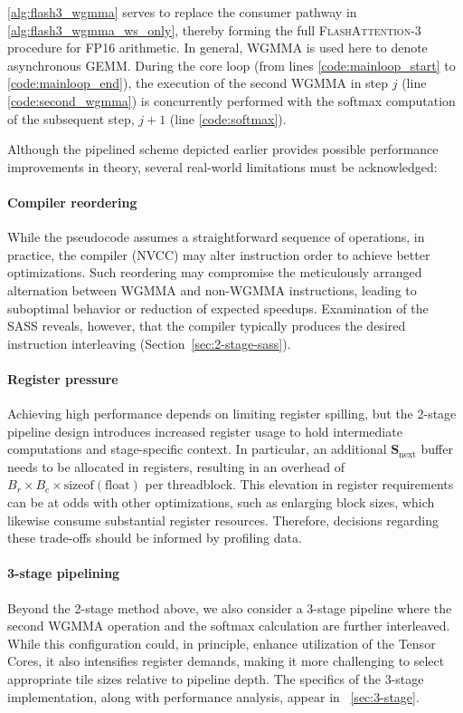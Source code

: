 \cref{alg:flash3_wgmma} serves to replace the consumer pathway in \cref{alg:flash3_wgmma_ws_only}, thereby forming the full \textsc{FlashAttention-3} procedure for FP16 arithmetic. In general, WGMMA is used here to denote asynchronous GEMM. During the core loop (from lines \ref{code:mainloop_start} to \ref{code:mainloop_end}), the execution of the second WGMMA in step $j$ (line \ref{code:second_wgmma}) is concurrently performed with the softmax computation of the subsequent step, $j+1$ (line \ref{code:softmax}).

Although the pipelined scheme depicted earlier provides possible performance improvements in theory, several real-world limitations must be acknowledged:
\paragraph{Compiler reordering} While the pseudocode assumes a straightforward sequence of operations, in practice, the compiler (NVCC) may alter instruction order to achieve better optimizations. Such reordering may compromise the meticulously arranged alternation between WGMMA and non-WGMMA instructions, leading to suboptimal behavior or reduction of expected speedups. Examination of the SASS reveals, however, that the compiler typically produces the desired instruction interleaving (Section~\ref{sec:2-stage-sass}).
\paragraph{Register pressure} Achieving high performance depends on limiting register spilling, but the 2-stage pipeline design introduces increased register usage to hold intermediate computations and stage-specific context. In particular, an additional $\mathbf{S}_{\mathrm{next}}$ buffer needs to be allocated in registers, resulting in an overhead of $B_r \times B_c \times \text{sizeof}(\text{float})$ per threadblock. This elevation in register requirements can be at odds with other optimizations, such as enlarging block sizes, which likewise consume substantial register resources. Therefore, decisions regarding these trade-offs should be informed by profiling data.
\paragraph{3-stage pipelining} Beyond the 2-stage method above, we also consider a 3-stage pipeline where the second WGMMA operation and the softmax calculation are further interleaved. While this configuration could, in principle, enhance utilization of the Tensor Cores, it also intensifies register demands, making it more challenging to select appropriate tile sizes relative to pipeline depth. The specifics of the 3-stage implementation, along with performance analysis, appear in ~\cref{sec:3-stage}.

